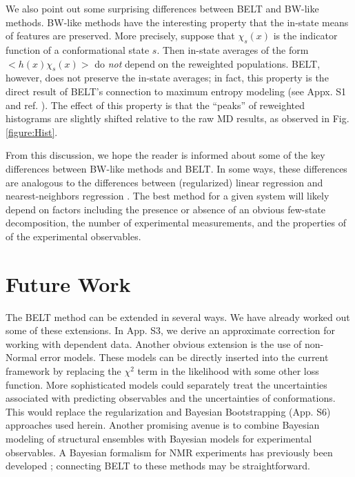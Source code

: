 \documentclass[11pt,titlepage]{article}
\begin{document}
We also point out some surprising differences between BELT and BW-like methods.  BW-like methods have the interesting property that the in-state means of features are preserved.  More precisely, suppose that $\chi_s(x)$ is the indicator function of a conformational state $s$.  Then in-state averages of the form $<h(x) \chi_s(x)>$ do \emph{not} depend on the reweighted populations.  BELT, however, does not preserve the in-state averages; in fact, this property is the direct result of BELT's connection to maximum entropy modeling (see Appx. S1 and ref. \citep{chodera2012}).  The effect of this property is that the ``peaks'' of reweighted histograms are slightly shifted relative to the raw MD results, as observed in Fig. \ref{figure:Hist}.   

From this discussion, we hope the reader is informed about some of the key differences between BW-like methods and BELT.  In some ways, these differences are analogous to the differences between (regularized) linear regression and nearest-neighbors regression \cite{friedman2001elements}.  The best method for a given system will likely depend on factors including the presence or absence of an obvious few-state decomposition, the number of experimental measurements, and the properties of of the experimental observables.  




\section*{Future Work}

The BELT method can be extended in several ways.  We have already worked out some of these extensions.  In App. S3, we derive an approximate correction for working with dependent data.  Another obvious extension is the use of non-Normal error models.  These models can be directly inserted into the current framework by replacing the $\chi^2$ term in the likelihood with some other loss function.  More sophisticated models could separately treat the uncertainties associated with predicting observables and the uncertainties of conformations.  This would replace the regularization and Bayesian Bootstrapping (App. S6) approaches used herein.  Another promising avenue is to combine Bayesian modeling of structural ensembles with Bayesian models for experimental observables.  A Bayesian formalism for NMR experiments has previously been developed \citep{rieping2005, habeck2006, habeck2005bayesian}; connecting BELT to these methods may be straightforward.  
\end{document}
